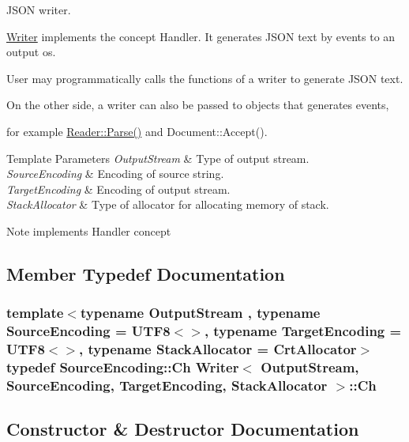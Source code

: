 J\+S\+ON writer. 

\hyperlink{classWriter}{Writer} implements the concept Handler. It generates J\+S\+ON text by events to an output os.

User may programmatically calls the functions of a writer to generate J\+S\+ON text.

On the other side, a writer can also be passed to objects that generates events,

for example \hyperlink{classGenericReader_a0c450620d14ff1824e58bb7bd9b42099}{Reader\+::\+Parse()} and Document\+::\+Accept().


\begin{DoxyTemplParams}{Template Parameters}
{\em Output\+Stream} & Type of output stream. \\
\hline
{\em Source\+Encoding} & Encoding of source string. \\
\hline
{\em Target\+Encoding} & Encoding of output stream. \\
\hline
{\em Stack\+Allocator} & Type of allocator for allocating memory of stack. \\
\hline
\end{DoxyTemplParams}
\begin{DoxyNote}{Note}
implements Handler concept 
\end{DoxyNote}


\subsection{Member Typedef Documentation}
\subsubsection[{\texorpdfstring{Ch}{Ch}}]{\setlength{\rightskip}{0pt plus 5cm}template$<$typename Output\+Stream , typename Source\+Encoding  = U\+T\+F8$<$$>$, typename Target\+Encoding  = U\+T\+F8$<$$>$, typename Stack\+Allocator  = Crt\+Allocator$>$ typedef Source\+Encoding\+::\+Ch {\bf Writer}$<$ Output\+Stream, Source\+Encoding, Target\+Encoding, Stack\+Allocator $>$\+::{\bf Ch}}\hypertarget{classWriter_a5ba0d623162839460024b517fc2d5868}{}\label{classWriter_a5ba0d623162839460024b517fc2d5868}


\subsection{Constructor \& Destructor Documentation}

